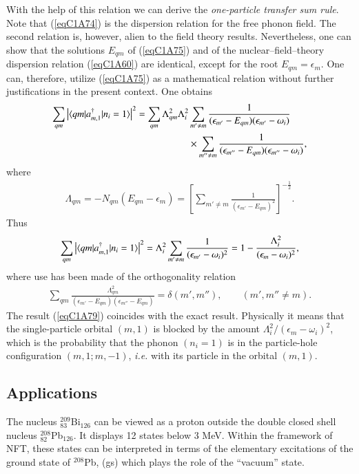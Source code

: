 With the help of this relation we can derive the\textit{ one-particle transfer sum rule}. Note that (\ref{eqC1A74}) is the dispersion relation for the free phonon field. The second relation is, however, alien to the field theory results. Nevertheless, one can show that the solutions $E_{qm}$ of (\ref{eqC1A75}) and of the nuclear--field--theory dispersion relation (\ref{eqC1A60}) are identical, except for the root $E_{qm}=\epsilon_m$. One can, therefore, utilize (\ref{eqC1A75}) as a mathematical relation without further justifications in the 
present context. One obtains 
  \begin{align}\label{eqC1A77} 
   \nonumber \sum_{qm}\left|\langle {qm|a^\dagger_{m,1}|n_i=1} \rangle\right|^2=\sum_{qm}\Lambda_{qm}^2\Lambda_i^2& \sum_{m'\neq m}\frac{1}{(\epsilon_{m'}-E_{qm})(\epsilon_{m'}-\omega_i)}\\
   &\times \sum_{m''\neq m}\frac{1}{(\epsilon_{m''}-E_{qm})(\epsilon_{m''}-\omega_i)},
    \end{align} 
where
  \begin{align}\label{eqC1A78} 
   \Lambda_{qm}=-N_{qm}(E_{qm}-\epsilon_m)=\left[\sum_{m'\neq m}\frac{1}{\left(\epsilon_{m'}-E_{qm}\right)^2}\right]^{-\frac{1}{2}}.
    \end{align} 
    Thus
      \begin{align}\label{eqC1A79} 
 \sum_{qm}\left|\langle {qm|a^\dagger_{m,1}|n_i=1} \rangle\right|^2=\Lambda_i^2\sum_{m'\neq m}\frac{1}{(\epsilon_{m'}-\omega_i)^2}=1-\frac{\Lambda^2_i}{(\epsilon_m-\omega_i)^2},     
        \end{align} 
where use has been made of the orthogonality relation 
  \begin{align}\label{eqC1A80} 
\sum_{qm}\frac{\Lambda_{qm}^2}{(\epsilon_{m'}-E_{qm})(\epsilon_{m''}-E_{qm})}=\delta(m',m''),\qquad (m',m''\neq m).
    \end{align}  
The result (\ref{eqC1A79}) coincides with the exact result. Physically it means that the single-particle orbital $(m, 1)$ is blocked by the amount $\Lambda_i^2/(\epsilon_m-\omega_i)^2$, which is the probability that the phonon $(n_i= 1)$ is in the particle-hole configuration $(m,1;m,-1)$, \textit{i.e.} with its particle in the orbital $(m,1)$. 
\subsection{Applications}\label{Sect1.7.4}
The nucleus $^{209}_{83}$Bi$_{126}$ can be viewed as a proton outside the double closed shell nucleus $^{208}_{82}$Pb$_{126}$. It displays 12 states below 3 MeV. Within the framework of NFT, these states can be interpreted in terms of the elementary excitations of the ground state  of $^{208}$Pb, (gs) which plays the role of the ``vacuum'' state.


